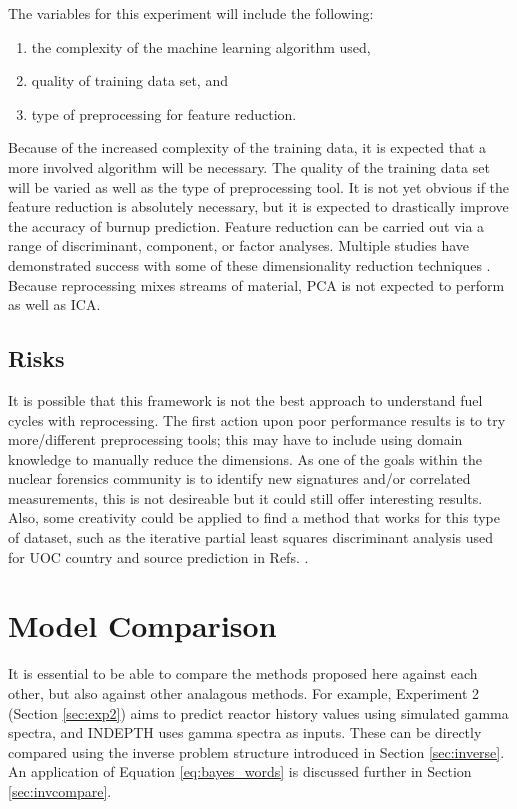 The variables for this experiment will include the following:
\begin{enumerate}
  \itemsep-0.75em
  \item the complexity of the machine learning algorithm used,
  \item quality of training data set, and 
  \item type of preprocessing for feature reduction.
\end{enumerate}
Because of the increased complexity of the training data, it is expected that a
more involved algorithm will be necessary.  The quality of the training data
set will be varied as well as the type of preprocessing tool.  It is not yet
obvious if the feature reduction is absolutely necessary, but it is expected to
drastically improve the accuracy of burnup prediction.  Feature reduction can
be carried out via a range of discriminant, component, or factor analyses.
Multiple studies have demonstrated success with some of these dimensionality
reduction techniques \cite{nicolaou_2006, nicolaou_2009, nicolaou_2014,
robel_2009, pu_discrimination, jones_viz_2014, jones_snf_2014}.  Because
reprocessing mixes streams of material, \gls{PCA} is not expected to perform as
well as \gls{ICA}.

\subsection*{Risks}

It is possible that this framework is not the best approach to understand fuel
cycles with reprocessing. The first action upon poor performance results is to
try more/different preprocessing tools; this may have to include using domain
knowledge to manually reduce the dimensions. As one of the goals within the
nuclear forensics community is to identify new signatures and/or correlated
measurements, this is not desireable but it could still offer interesting
results. Also, some creativity could be applied to find a method that works for
this type of dataset, such as the iterative partial least squares discriminant
analysis used for \gls{UOC} country and source prediction in Refs.
\cite{robel_2009, pu_discrimination}.

\section{Model Comparison}
\label{sec:modelcompare}

It is essential to be able to compare the methods proposed here against each
other, but also against other analagous methods. For example, Experiment 2
(Section \ref{sec:exp2}) aims to predict reactor history values using simulated
gamma spectra, and \gls{INDEPTH} uses gamma spectra as inputs.  These can be
directly compared using the inverse problem structure introduced in Section
\ref{sec:inverse}. An application of Equation \ref{eq:bayes_words} is discussed
further in Section \ref{sec:invcompare}.

